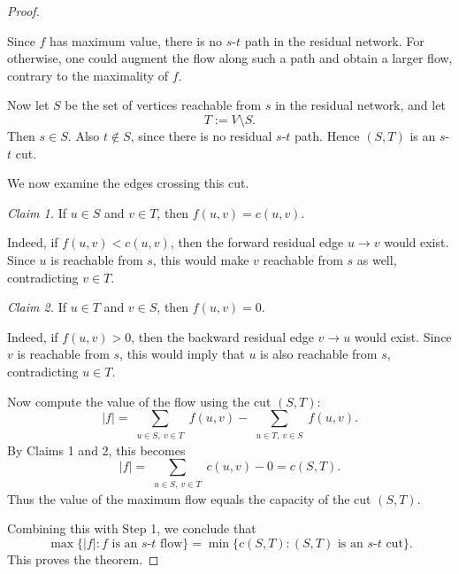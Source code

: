 \documentclass[11pt, a4paper]{ctexrep}
\begin{document}
\begin{proof}
\begin{center}
    \end{center}

    Since $f$ has maximum value, there is no $s$-$t$ path in the residual network.
    For otherwise, one could augment the flow along such a path and obtain a larger flow,
    contrary to the maximality of $f$.

    Now let $S$ be the set of vertices reachable from $s$ in the residual network,
    and let
    \[
        T:=V\setminus S.
    \]
    Then $s\in S$. Also $t\notin S$, since there is no residual $s$-$t$ path.
    Hence $(S,T)$ is an $s$-$t$ cut.

    We now examine the edges crossing this cut.

    \smallskip
    \noindent
    \emph{Claim 1.} If $u\in S$ and $v\in T$, then $f(u,v)=c(u,v)$.

    Indeed, if $f(u,v)<c(u,v)$, then the forward residual edge $u\to v$ would exist.
    Since $u$ is reachable from $s$, this would make $v$ reachable from $s$ as well,
    contradicting $v\in T$.

    \smallskip
    \noindent
    \emph{Claim 2.} If $u\in T$ and $v\in S$, then $f(u,v)=0$.

    Indeed, if $f(u,v)>0$, then the backward residual edge $v\to u$ would exist.
    Since $v$ is reachable from $s$, this would imply that $u$ is also reachable from
    $s$, contradicting $u\in T$.

    \smallskip
    Now compute the value of the flow using the cut $(S,T)$:
    \[
        |f|
        =
        \sum_{\substack{u\in S,\ v\in T}} f(u,v)
        -
        \sum_{\substack{u\in T,\ v\in S}} f(u,v).
    \]
    By Claims 1 and 2, this becomes
    \[
        |f|
        =
        \sum_{\substack{u\in S,\ v\in T}} c(u,v)-0
        =
        c(S,T).
    \]
    Thus the value of the maximum flow equals the capacity of the cut $(S,T)$.

    Combining this with Step 1, we conclude that
    \[
        \max\{|f|: f \text{ is an $s$-$t$ flow}\}
        =
        \min\{c(S,T): (S,T)\text{ is an $s$-$t$ cut}\}.
    \]
    This proves the theorem.
\end{proof}
\end{document}
